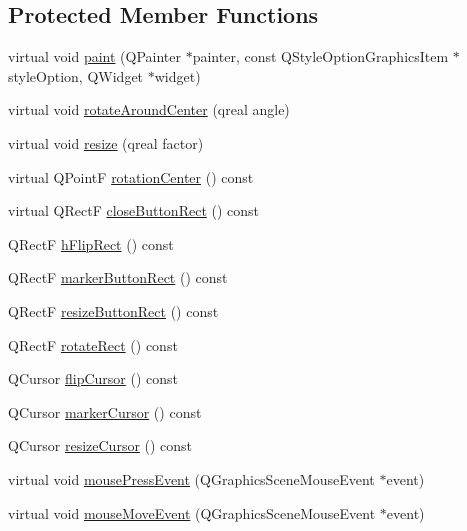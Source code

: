 \subsection*{Protected Member Functions}
\begin{DoxyCompactItemize}
\item 
virtual void \hyperlink{class_u_b_graphics_aristo_aa4bcaa89d15302de155cb71c00b59c8d}{paint} (Q\-Painter $\ast$painter, const Q\-Style\-Option\-Graphics\-Item $\ast$style\-Option, Q\-Widget $\ast$widget)
\item 
virtual void \hyperlink{class_u_b_graphics_aristo_a775e8bff5ff03371f9b6b1769277245e}{rotate\-Around\-Center} (qreal angle)
\item 
virtual void \hyperlink{class_u_b_graphics_aristo_a471b1006f1e88b392712b7aad8a18d55}{resize} (qreal factor)
\item 
virtual Q\-Point\-F \hyperlink{class_u_b_graphics_aristo_a2d6e4e79ddf6fa78100f0faf9fa04c4f}{rotation\-Center} () const 
\item 
virtual Q\-Rect\-F \hyperlink{class_u_b_graphics_aristo_a0920748116645fa3f2e7f369c9ca005e}{close\-Button\-Rect} () const 
\item 
Q\-Rect\-F \hyperlink{class_u_b_graphics_aristo_a3a2030ef56785d9a7fcef713c3f1587c}{h\-Flip\-Rect} () const 
\item 
Q\-Rect\-F \hyperlink{class_u_b_graphics_aristo_a7ff325c889d34aeaaa285a5e4c4c5efd}{marker\-Button\-Rect} () const 
\item 
Q\-Rect\-F \hyperlink{class_u_b_graphics_aristo_a20c43f4b37afd8dc774306ebf7f652da}{resize\-Button\-Rect} () const 
\item 
Q\-Rect\-F \hyperlink{class_u_b_graphics_aristo_ae8f5828cbb7ea2e9eede89955541e2fb}{rotate\-Rect} () const 
\item 
Q\-Cursor \hyperlink{class_u_b_graphics_aristo_a9585b440cea0b3f8372ee57bcb8ba8d8}{flip\-Cursor} () const 
\item 
Q\-Cursor \hyperlink{class_u_b_graphics_aristo_a8ed657442889f6b2c48712277c2791ee}{marker\-Cursor} () const 
\item 
Q\-Cursor \hyperlink{class_u_b_graphics_aristo_a26d7eda2a9ae104078793457f8e4d7c8}{resize\-Cursor} () const 
\item 
virtual void \hyperlink{class_u_b_graphics_aristo_a1de606930da513b9da811584642489fe}{mouse\-Press\-Event} (Q\-Graphics\-Scene\-Mouse\-Event $\ast$event)
\item 
virtual void \hyperlink{class_u_b_graphics_aristo_ab97120a624364cbe109c1a0194b7e3b1}{mouse\-Move\-Event} (Q\-Graphics\-Scene\-Mouse\-Event $\ast$event)

\end{DoxyCompactItemize}

